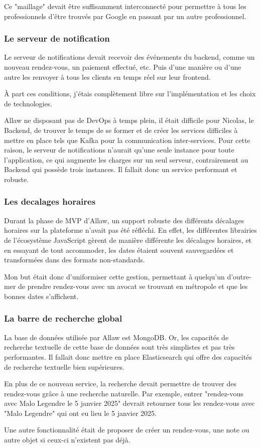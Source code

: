 Ce "maillage" devait être suffisamment interconnecté pour permettre à tous les
professionnels d'être trouvés par Google en passant par un autre professionnel.

\subsubsection{Le serveur de notification}

Le serveur de notifications devait recevoir des événements du backend, comme
un nouveau rendez-vous, un paiement effectué, etc. Puis d'une manière ou d'une
autre les renvoyer à tous les clients en temps réel sur leur frontend.

À part ces conditions, j'étais complètement libre sur l'implémentation et les
choix de technologies.

Allaw ne disposant pas de DevOps à temps plein, il était difficile pour Nicolas,
le Backend, de trouver le temps de se former et de créer les services difficiles
à mettre en place tels que Kafka pour la communication inter-services. Pour
cette raison, le serveur de notifications n'aurait qu'une seule instance
pour toute l'application, ce qui augmente les charges sur un seul serveur,
contrairement au Backend qui possède trois instances. Il fallait donc un service
performant et robuste.

\subsubsection{Les decalages horaires}

Durant la phase de MVP d'Allaw, un support robuste des différents décalages
horaires sur la plateforme n'avait pas été réfléchi. En effet, les différentes
librairies de l'écosystème JavaScript gèrent de manière différente les
décalages horaires, et en essayant de tout accommoder, les dates étaient souvent
sauvegardées et transformées dans des formats non-standards.

Mon but était donc d'uniformiser cette gestion, permettant à quelqu'un
d'outre-mer de prendre rendez-vous avec un avocat se trouvant en métropole et
que les bonnes dates s'affichent.

\subsubsection{La barre de recherche global}

La base de données utilisée par Allaw est MongoDB. Or, les capacités de
recherche textuelle de cette base de données sont très simplistes et pas très
performantes. Il fallait donc mettre en place Elasticsearch qui offre des
capacités de recherche textuelle bien supérieures.

En plus de ce nouveau service, la recherche devait permettre de trouver des
rendez-vous grâce à une recherche naturelle. Par exemple, entrer "rendez-vous
avec Malo Legendre le 5 janvier 2025" devrait retourner tous les rendez-vous
avec "Malo Legendre" qui ont eu lieu le 5 janvier 2025.

Une autre fonctionnalité était de proposer de créer un rendez-vous, une note ou
autre objet si ceux-ci n'existent pas déjà.
